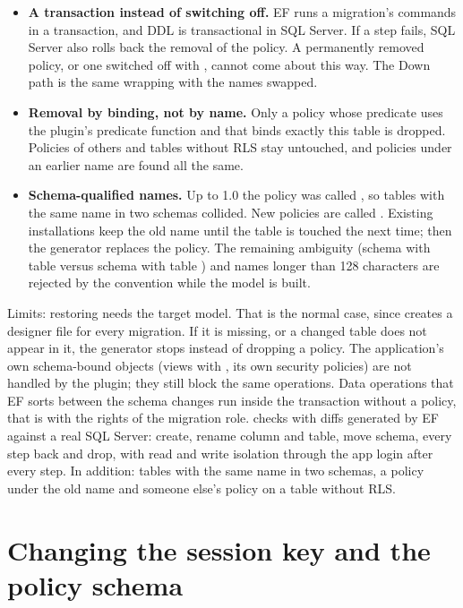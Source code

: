 \begin{itemize}
  \item \textbf{A transaction instead of switching off.} EF runs a migration's commands in a
    transaction, and DDL is transactional in SQL Server. If a step fails, SQL Server also
    rolls back the removal of the policy. A permanently removed policy, or one switched off
    with , cannot come about this way. The Down path is the same wrapping
    with the names swapped.
  \item \textbf{Removal by binding, not by name.} Only a policy whose predicate uses the
    plugin's predicate function and that binds exactly this table is dropped. Policies of
    others and tables without RLS stay untouched, and policies under an earlier name are
    found all the same.
  \item \textbf{Schema-qualified names.} Up to 1.0 the policy was called
    , so tables with the same name in two schemas collided.
    New policies are called . Existing
    installations keep the old name until the table is touched the next time; then the
    generator replaces the policy. The remaining ambiguity (schema  with table
     versus schema  with table ) and names longer than 128
    characters are rejected by the convention while the model is built.
\end{itemize}

Limits: restoring needs the target model. That is the normal case, since
 creates a designer file for every migration. If it is
missing, or a changed table does not appear in it, the generator stops instead of dropping a
policy. The application's own schema-bound objects (views with , its own
security policies) are not handled by the plugin; they still block the same operations. Data
operations that EF sorts between the schema changes run inside the transaction without a
policy, that is with the rights of the migration role.
 checks with diffs
generated by EF against a real SQL Server: create, rename column and table, move schema, every
step back and drop, with read and write isolation through the app login after every step. In
addition: tables with the same name in two schemas, a policy under the old name and someone
else's policy on a table without RLS.

\section{Changing the session key and the policy schema}\label{sec:sqlserver-session-settings}

